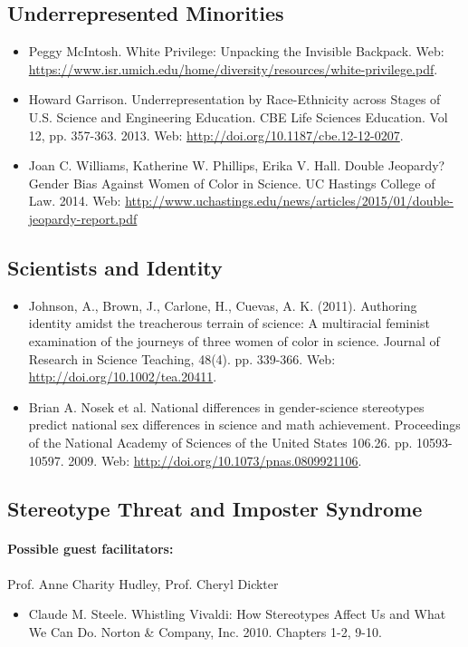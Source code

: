 \documentclass{article}
\begin{document}
\subsection{Underrepresented Minorities}
\begin{itemize}
\item Peggy McIntosh. White Privilege: Unpacking the Invisible Backpack. Web: \url{https://www.isr.umich.edu/home/diversity/resources/white-privilege.pdf}.
\item Howard Garrison. Underrepresentation by Race-Ethnicity across Stages of U.S. Science and Engineering Education. CBE Life Sciences Education. Vol 12, pp. 357-363. 2013. Web: \url{http://doi.org/10.1187/cbe.12-12-0207}.
\item Joan C. Williams, Katherine W. Phillips, Erika V. Hall. Double Jeopardy? Gender Bias Against Women of Color in Science. UC Hastings College of Law. 2014. Web: \url{http://www.uchastings.edu/news/articles/2015/01/double-jeopardy-report.pdf}
\end{itemize}


\subsection{Scientists and Identity }
\begin{itemize}
\item Johnson, A., Brown, J., Carlone, H., Cuevas, A. K. (2011). Authoring identity amidst the treacherous terrain of science: A multiracial feminist examination of the  journeys of three women of color in science. Journal of Research in Science Teaching, 48(4).  pp. 339-366. Web: \url{http://doi.org/10.1002/tea.20411}.
\item Brian A. Nosek et al. National differences in gender-science stereotypes predict national sex differences in science and math achievement. Proceedings of the National Academy of Sciences of the United States 106.26. pp. 10593-10597. 2009. Web: \url{http://doi.org/10.1073/pnas.0809921106}.
\end{itemize}

\subsection{Stereotype Threat and Imposter Syndrome}
\paragraph{Possible guest facilitators:} Prof. Anne Charity Hudley, Prof. Cheryl Dickter
\begin{itemize}
\item Claude M. Steele. Whistling Vivaldi: How Stereotypes Affect Us and What We Can Do. Norton \& Company, Inc. 2010. Chapters 1-2, 9-10.
\end{itemize}
\end{document}
